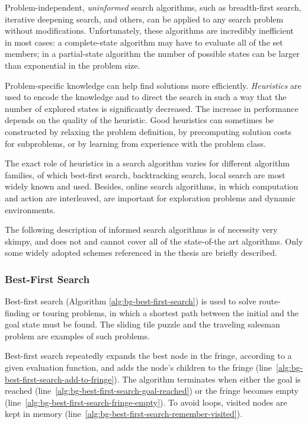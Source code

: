 Problem-independent, {\it uninformed} search algorithms, such as
breadth-first search, iterative deepening search, and others, can be
applied to any search problem without modifications. Unfortunately,
these algorithms are incredibly inefficient in most cases: a
complete-state algorithm may have to evaluate all of the set members;
in a partial-state algorithm the number of possible states can be
larger than exponential in the problem size. 

Problem-specific knowledge can help find solutions more
efficiently. {\em Heuristics} are used to encode the knowledge and to
direct the search in such a way that the number of explored states is
significantly decreased. The increase in performance depends on the
quality of the heuristic. Good heuristics can sometimes be constructed
by relaxing the problem definition, by precomputing solution costs for
subproblems, or by learning from experience with the problem class.

The exact role of heuristics in a search algorithm varies for
different algorithm families, of which best-first search, backtracking
search, local search are most widely known and used. Besides, online
search algorithms, in which computation and action are interleaved,
are important for exploration problems and dynamic environments.

The following description of informed search algorithms is of
necessity very skimpy, and does not and cannot cover all of the
state-of-the art algorithms. Only some widely adopted schemes
referenced in the thesis are briefly described.
                             
\subsubsection{Best-First Search}

Best-first search (Algorithm \ref{alg:bg-best-first-search}) is used to
solve route-finding or touring problems, in which a shortest path
between the initial and the goal state must be found. The sliding tile
puzzle and the traveling salesman problem are examples of such
problems.

Best-first search repeatedly expands the best node in the fringe,
according to a given evaluation function, and adds the node's children
to the fringe (line~\ref{alg:bg-best-first-search-add-to-fringe}). The
algorithm terminates when either the goal is reached
(line~\ref{alg:bg-best-first-search-goal-reached}) or the fringe becomes
empty (line~\ref{alg:bg-best-first-search-fringe-empty}). To avoid
loops, visited nodes are kept in memory (line~\ref{alg:bg-best-first-search-remember-visited}).

